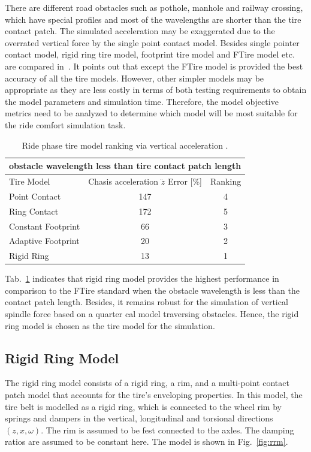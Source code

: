 There are different road obstacles such as pothole, manhole and railway crossing, which have special profiles and most of the wavelengths are shorter than the tire contact patch. 
%
The simulated acceleration may be exaggerated due to the overrated vertical force by the single point contact model. 
%
Besides single pointer contact model, rigid ring tire model, footprint tire model and FTire model etc. are compared in~\cite{frey2012development}.
%
It points out that except the FTire model is provided the best accuracy of all the tire models.
%
However, other simpler models may be appropriate as they are less costly in terms of both testing requirements to obtain the model parameters and simulation time.
%
Therefore, the model objective metrics need to be analyzed to determine which model will be most
suitable for the ride comfort simulation task.

\begin{table}
\centering
\caption{Ride phase tire model ranking via vertical acceleration \cite{frey2012development}.}
\label{tbl:tire_models}
\begin{tabular}{lcc}
\hline
 \multicolumn{3}{c}{obstacle wavelength less than tire contact patch length} \\ \hline
Tire Model & Chasis acceleration $\ddot{z}$ Error [\%] & Ranking \\ \hline
Point Contact & 147 & 4 \\
Ring Contact & 172 & 5 \\
Constant Footprint & 66 & 3 \\
Adaptive Footprint & 20 & 2 \\
Rigid Ring & 13 & 1 \\
\hline
\end{tabular}
\end{table}

Tab.~\ref{tbl:tire_models} indicates that rigid ring model provides the highest performance in comparison to the FTire standard when the obstacle wavelength is less than the contact patch length.
%
Besides, it remains robust for the simulation of vertical spindle force based on a quarter cal model traversing obstacles.
%
Hence, the rigid ring model is chosen as the tire model for the simulation.
 
 
\subsection{Rigid Ring Model}
 
The rigid ring model consists of a rigid ring, a rim, and a multi-point contact patch model that accounts for the tire’s enveloping properties. 
%
In this model, the tire belt is modelled as a rigid ring, which is connected to the wheel rim by springs and dampers in the vertical, longitudinal and torsional directions $(z,x,\omega)$.
%
The rim is assumed to be fest connected to the axles.
%
The damping ratios are assumed to be constant here.
%
The model is shown in Fig.~\ref{fig:rrm}.

